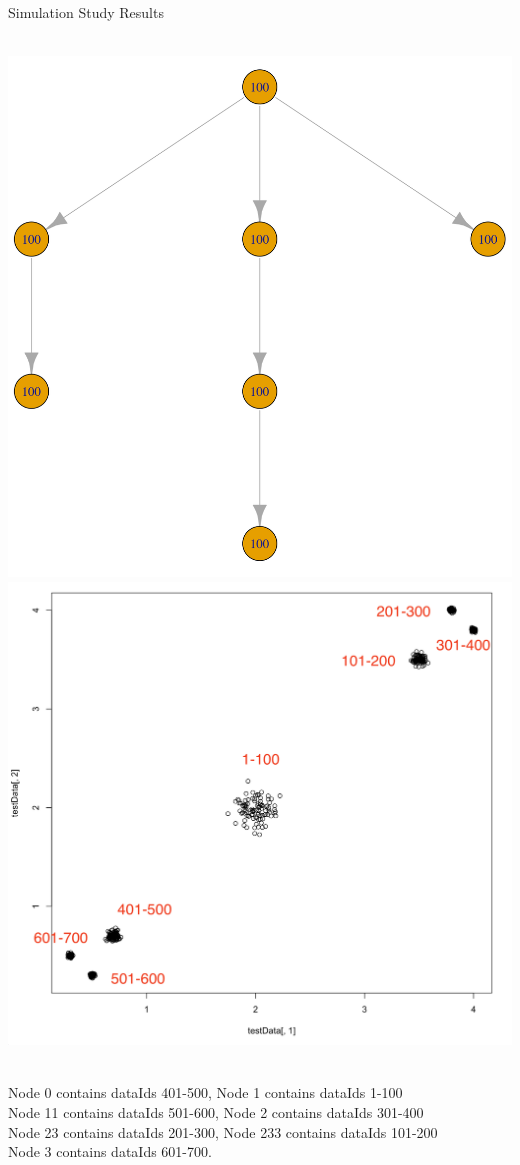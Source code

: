 \documentclass[10 pt]{beamer}
\begin{document}
\begin{frame}{Simulation Study}
	Results\\
	~\\
\centerline{\includegraphics[scale=0.2]{figs/simRes.png}
\includegraphics[scale=0.15]{figs/simulationData.png}}
~\\
Node 0 contains dataIds 401-500,  Node 1 contains dataIds 1-100  \\
Node 11 contains dataIds 501-600, Node 2 contains dataIds 301-400 \\
Node 23 contains dataIds 201-300, Node 233 contains dataIds 101-200\\
Node 3 contains dataIds 601-700.
\end{frame}
\end{document}
